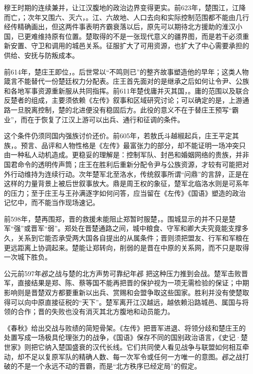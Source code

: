穆王时期的连续兼并，让江汉腹地的政治边界变得更实。前623年，楚围江，江降而亡，；次年又围六、灭六，。江、六故地、人口去向和实际控制范围都不能由几行经传精确画出，但这两件事表明齐霸衰落以后，原先可以期待北方援助的淮汉小国，已更难维持原有位置。楚取得的不是一张现代意义的疆界图，而是若干必须重新安置、守卫和调用的城邑关系。征服扩大了可用资源，也扩大了中心需要承担的供给、安抚与防叛成本。

前614年，楚庄王即位，。后世常以“不鸣则已”的整齐故事塑造他的早年；这类人物箴言不能替代一份楚廷权力分配表。庄王首先面对的是继承之后如何让令尹、公族和各地军事资源重新服从共同指挥。前611年楚伐庸并灭其国，。庸的范围以及联合反楚者的组成，主要须依赖《左传》叙事和区域研究讨论；可以确定的是，上游通路一旦脱离控制，楚的北进便没有稳固后方。此役的意义不在于替庄王预写“霸业”，而在于恢复了江汉上游可以出兵、通行和征调的条件。

这个条件仍须同国内强族讨价还价。前605年，若敖氏斗越椒起兵，庄王平定其族，。预言、品评和人物性格是《左传》最富张力的部分，却不能证明一场冲突只由一种私人动机造成。更稳妥的理解是：控制军队、封邑和婚姻网络的贵族，并非国君命令的透明传声筒；庄王在胜利后重新分配令尹与公族资源，才较有可能把对外行动维持为连续行动。次年楚军北至洛水，传统叙事所谓“问鼎”的言辞，正是在这样的力量背景上被后世叙事放大。鼎是周王权的象征，楚军北临洛水则是可系年的压力；至于庄王与王孙满逐字如何问答，应当留在《左传》《国语》塑造的政治记忆中，而不能当作现场速记。

前598年，楚再围郑，晋的救援未能阻止郑暂时服楚，。围城显示的并不只是楚军“强”或晋军“弱”。郑处在晋楚通路之间，城中粮食、守军和卿大夫究竟能支撑多久，关系到它能否承受两大国各自提出的从属条件；晋则须把盟友、行军和军粮在更远距离上协调起来。楚能让郑转向，削弱的是晋在中原的关系网，而不只是取得一次城下胜负。

\begin{event}{公元前597年}{邲之战与楚的北方声势}{可靠纪年}{邲}
把这种压力推到会战。楚军击败晋军，直接结果是郑、陈、蔡等国不能再把晋的保护视为一项无需检验的保证；中期影响则是晋楚双方都要重新以出兵、赏赐和会盟争取这些国家。胜利并没有使楚取得可以向中原直接征税的“天下”。楚军离开江汉越远，越依赖沿路城邑、属国与将领的合作；晋的失败也没有消灭其北方腹地和动员能力。

《春秋》给出交战与败绩的简短骨架。《左传》把晋军进退、将领分歧和楚庄王的处置写成一场极具伦理张力的战争，《国语》保存不同的国别政治语言，《史记·楚世家》则把它纳入楚国盛衰的汉代长线。它们共同使人看见战争与联盟如何相互牵动，却不足以复原军队的精确人数、每一次军令或任何一方唯一的意图。邲之战打破的不是一个永远不动的晋霸，而是“北方秩序已经定局”的假定。
\end{event}

